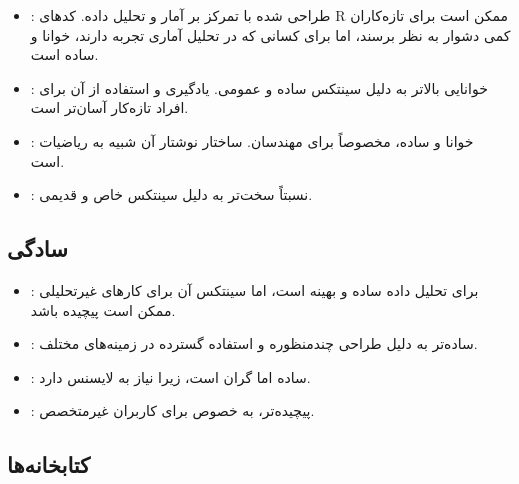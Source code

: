\documentclass[11pt, a4paper, oneside]{book}
\begin{document}
				\begin{itemize}
					
					\item {\large {}}:
					{\normalsize طراحی شده با تمرکز بر آمار و تحلیل داده. کدهای R ممکن است برای تازه‌کاران کمی دشوار به نظر برسند، اما برای کسانی که در تحلیل آماری تجربه دارند، خوانا و ساده است.}
					
					\item {\large {}}:
					{\normalsize خوانایی بالاتر به دلیل سینتکس ساده و عمومی. یادگیری و استفاده از آن برای افراد تازه‌کار آسان‌تر است.}
					
					\item {\large {}}:
					{\normalsize خوانا و ساده، مخصوصاً برای مهندسان. ساختار نوشتار آن شبیه به ریاضیات است.}
					
					\item {\large {}}:
					{\normalsize نسبتاً سخت‌تر به دلیل سینتکس خاص و قدیمی.}
					
				\end{itemize}
		
			\subsection{سادگی}
			
				\begin{itemize}
					
					\item {\large {}}:
					{\normalsize برای تحلیل داده ساده و بهینه است، اما سینتکس آن برای کارهای غیرتحلیلی ممکن است پیچیده باشد.}
					
					\item {\large {}}:
					{\normalsize ساده‌تر به دلیل طراحی چندمنظوره و استفاده گسترده در زمینه‌های مختلف.}
					
					\item {\large {}}:
					{\normalsize ساده اما گران است، زیرا نیاز به لایسنس دارد.}
					
					\item {\large {}}:
					{\normalsize پیچیده‌تر، به خصوص برای کاربران غیرمتخصص.}
					
				\end{itemize}
				
				
			\subsection{کتابخانه‌ها}
				
\end{document}
